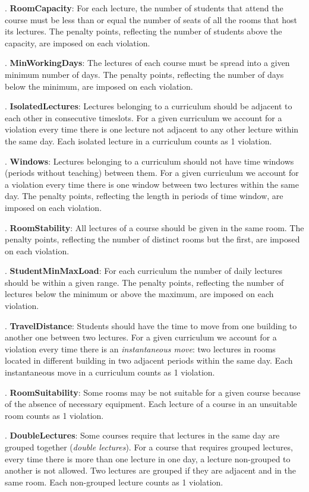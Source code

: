 \begin{list}{}{}
\item{}. \textbf{RoomCapacity}: 
  For each lecture, the number of students that attend the course must
  be less than or equal the number of seats of all the rooms that host
  its lectures. 
  The penalty points, reflecting the number of students above the
  capacity, are imposed on each violation.
\item{}. \textbf{MinWorkingDays}: 
  The lectures of each course must be spread into a given minimum
  number of days. 
  The penalty points, reflecting the number of days below the minimum,
  are imposed on each violation.
\item{}. \textbf{IsolatedLectures}: 
  Lectures belonging to a curriculum should be adjacent to each other
  in consecutive timeslots. For a given curriculum we account
  for a violation every time there is one lecture not adjacent to any
  other lecture within the same day. 
  Each isolated lecture in a curriculum counts as 1 violation.
\item{}. \textbf{Windows}: 
  Lectures belonging to a curriculum should not have time windows
  (periods without teaching) between them. 
  For a given
  curriculum we account for a violation every time there is one
  window between two lectures within the same day. 
  The penalty points, reflecting the length in periods of time window,
  are imposed on each violation.
\item{}. \textbf{RoomStability}: 
  All lectures of a course should be given in the same room. 
  The penalty points, reflecting the number of distinct rooms but the first, 
  are imposed on each violation.
\item{}. \textbf{StudentMinMaxLoad}: 
  For each curriculum the number of daily lectures should be within a
  given range. 
  The penalty points, reflecting the number of lectures below the minimum or above the
  maximum, are imposed on each violation.
\item{}. \textbf{TravelDistance}: 
  Students should have the time to move from one building to another
  one between two lectures. For a given curriculum we account for a
  violation every time there is an \textit{instantaneous move}: 
  two lectures in rooms located in different building in two adjacent
  periods within the same day. 
  Each instantaneous move in a curriculum counts as 1 violation.
\item{}. \textbf{RoomSuitability}:
  Some rooms may be not suitable for a given course because of the
  absence of necessary equipment.
  Each lecture of a course in an unsuitable room counts as 1
  violation.
\item{}. \textbf{DoubleLectures}:
  Some courses require that lectures in the same day are grouped
  together (\textit{double lectures}). For a course that requires grouped
  lectures, every time there is more than one lecture in one day, 
  a lecture non-grouped to another is not allowed. 
  Two lectures are grouped if they are adjacent and in the same room. 
  Each non-grouped lecture counts as 1 violation.
\end{list}

